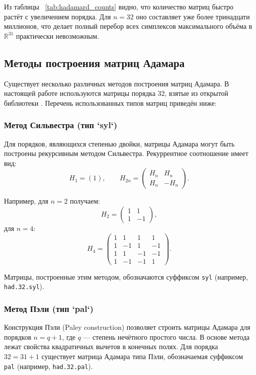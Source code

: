 \documentclass[a4paper,12pt]{article}
\theoremstyle{indented}
\begin{document}
Из таблицы ~\ref{tab:hadamard_counts} видно, что количество матриц быстро растёт с увеличением порядка. Для $n = 32$ оно составляет уже более тринадцати миллионов, что делает полный перебор всех симплексов максимального объёма в $\mathbb{R}^{31}$ практически невозможным.

\subsection{Методы построения матриц Адамара}

Существует несколько различных методов построения матриц Адамара. В настоящей работе используются матрицы порядка $32$, взятые из открытой библиотеки \cite{sloane_hadamard}. Перечень использованных типов матриц приведён ниже:

\subsubsection{Метод Сильвестра (тип `syl`)}

Для порядков, являющихся степенью двойки, матрицы Адамара могут быть построены рекурсивным методом Сильвестра. Рекуррентное соотношение имеет вид:
\[
H_{1} = (1), \qquad H_{2n} = \begin{pmatrix}
H_n & H_n \\
H_n & -H_n
\end{pmatrix}.
\]

Например, для $n = 2$ получаем:
\[
H_2 = \begin{pmatrix}
1 & 1 \\
1 & -1
\end{pmatrix},
\]
для $n = 4$:
\[
H_4 = \begin{pmatrix}
1 & 1 & 1 & 1 \\
1 & -1 & 1 & -1 \\
1 & 1 & -1 & -1 \\
1 & -1 & -1 & 1
\end{pmatrix}.
\]

Матрицы, построенные этим методом, обозначаются суффиксом \texttt{syl} (например, \texttt{had.32.syl}).

\subsubsection{Метод Пэли (тип `pal`)}

Конструкция Пэли (Paley construction) позволяет строить матрицы Адамара для порядков $n = q + 1$, где $q$ — степень нечётного простого числа. В основе метода лежат свойства квадратичных вычетов в конечных полях. Для порядка $32 = 31 + 1$ существует матрица Адамара типа Пэли, обозначаемая суффиксом \texttt{pal} (например, \texttt{had.32.pal}).
\end{document}
